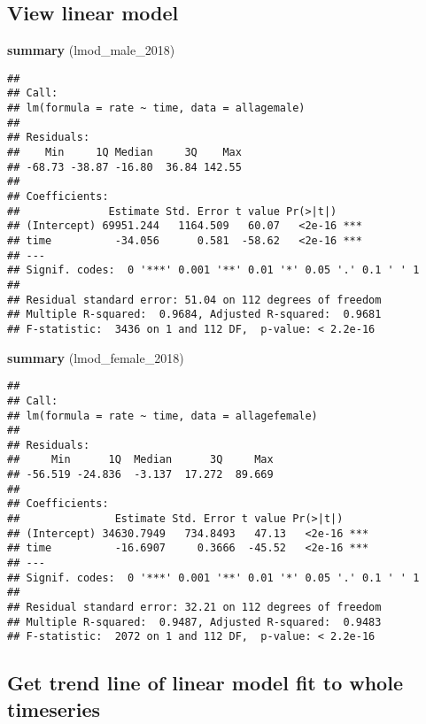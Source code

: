 \documentclass[]{article}
\newenvironment{Shaded}{\begin{snugshade}}{\end{snugshade}}
\newcommand{\KeywordTok}[1]{\textcolor[rgb]{0.13,0.29,0.53}{\textbf{#1}}}
\newcommand{\DecValTok}[1]{\textcolor[rgb]{0.00,0.00,0.81}{#1}}
\newcommand{\NormalTok}[1]{#1}
\begin{document}
\subsection{View linear model}\label{view-linear-model}

\begin{Shaded}
\begin{Highlighting}[]
\KeywordTok{summary}\NormalTok{ (lmod_male_}\DecValTok{2018}\NormalTok{)}
\end{Highlighting}
\end{Shaded}

\begin{verbatim}
## 
## Call:
## lm(formula = rate ~ time, data = allagemale)
## 
## Residuals:
##    Min     1Q Median     3Q    Max 
## -68.73 -38.87 -16.80  36.84 142.55 
## 
## Coefficients:
##              Estimate Std. Error t value Pr(>|t|)    
## (Intercept) 69951.244   1164.509   60.07   <2e-16 ***
## time          -34.056      0.581  -58.62   <2e-16 ***
## ---
## Signif. codes:  0 '***' 0.001 '**' 0.01 '*' 0.05 '.' 0.1 ' ' 1
## 
## Residual standard error: 51.04 on 112 degrees of freedom
## Multiple R-squared:  0.9684, Adjusted R-squared:  0.9681 
## F-statistic:  3436 on 1 and 112 DF,  p-value: < 2.2e-16
\end{verbatim}

\begin{Shaded}
\begin{Highlighting}[]
\KeywordTok{summary}\NormalTok{ (lmod_female_}\DecValTok{2018}\NormalTok{)}
\end{Highlighting}
\end{Shaded}

\begin{verbatim}
## 
## Call:
## lm(formula = rate ~ time, data = allagefemale)
## 
## Residuals:
##     Min      1Q  Median      3Q     Max 
## -56.519 -24.836  -3.137  17.272  89.669 
## 
## Coefficients:
##               Estimate Std. Error t value Pr(>|t|)    
## (Intercept) 34630.7949   734.8493   47.13   <2e-16 ***
## time          -16.6907     0.3666  -45.52   <2e-16 ***
## ---
## Signif. codes:  0 '***' 0.001 '**' 0.01 '*' 0.05 '.' 0.1 ' ' 1
## 
## Residual standard error: 32.21 on 112 degrees of freedom
## Multiple R-squared:  0.9487, Adjusted R-squared:  0.9483 
## F-statistic:  2072 on 1 and 112 DF,  p-value: < 2.2e-16
\end{verbatim}

\subsection{Get trend line of linear model fit to whole
timeseries}\label{get-trend-line-of-linear-model-fit-to-whole-timeseries}
\end{document}
